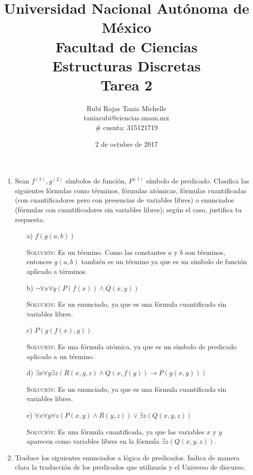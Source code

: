 \documentclass[letterpaper,11pt]{article}
\title{Universidad Nacional Autónoma de México \\
       Facultad de Ciencias \\
       Estructuras Discretas \\ 
       Tarea 2}
\author{Rubí Rojas Tania Michelle \\
        taniarubi@ciencias.unam.mx \\
        \# cuenta: 315121719}
\date{2 de octubre de 2017}
\begin{document}
\maketitle

\begin{enumerate}
    \item Sean $f^{(1)}, g^{(2)}$ símbolos de función, $P^{(1)}$ símbolo de 
    predicado. Clasifica las siguientes fórmulas como términos, fórmulas
    atómicas, fórmulas cuantificadas (con cuantificadores pero con presencias
    de variables libres) o enunciados (fórmulas con cuantificadores sin 
    variables libres); según el caso, justifica tu respuesta.

    \begin{itemize}
        \item[a)] $f(g(a,b))$

        \textsc{Solución:} Es un término. Como las constantes $a$ y $b$ son 
        términos, entonces $g(a,b)$ también es un término ya que es un símbolo 
        de función aplicado a términos. 

        \item[b)] $\neg ∀x ∀y (P(f(x)) \land Q(x, y))$

        \textsc{Solución:} Es un enunciado, ya que es una fórmula cuantificada 
        sin variables libres.

        \item[c)] $P(g(f(x), y))$

        \textsc{Solución:} Es una fórmula atómica, ya que es un símbolo de  
        predicado aplicado a un término.

        \item[d)] $∃x ∀y ∃z (R(x, y, z) \land Q(x, f(y)) → P(g(x,y)))$

        \textsc{Solución:} Es un enunciado, ya que es una fórmula cuantificada 
        sin variables libres.

        \item[e)] $∀x ∀y ∀z (P(x, y) \land R(y, z)) \lor ∃z (Q(x, y, z))$

        \textsc{Solución:} Es una fórmula cuantificada, ya que las variables 
        $x$ y $y$ aparecen como variables libres en la fórmula $∃z (Q(x, y, z))$.
    \end{itemize}

    \item Traduce los siguientes enunciados a lógica de predicados. Indica de  
    manera clara la traducción de los predicados que utilizarás y el Universo
    de discurso.


\end{enumerate}
\end{document}

